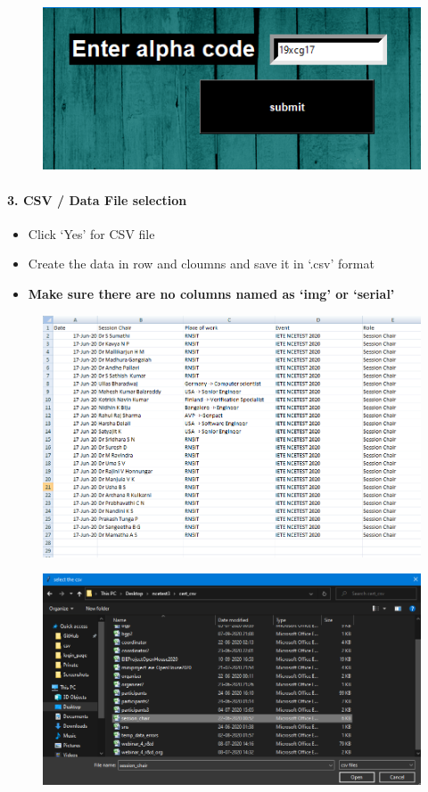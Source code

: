 \begin{figure}[H]
	\centering
	\includegraphics[width=0.5\linewidth]{"images/generation_qr_nqr/Screenshot (34)"}
	\label{fig:screenshot-34}
\end{figure}

\newpage
\paragraph{3. CSV / Data File selection}

\begin{itemize}
	\item Click `Yes' for CSV file
	\item Create the data in row and cloumns and save it in `.csv' format
	\item \textbf{Make sure there are no columns named as `img' or `serial'}
\end{itemize}

\begin{figure}[H]
	\centering
	\includegraphics[width=0.85\linewidth]{"images/generation_qr_nqr/Screenshot (37)"}
	\caption{}
	\label{fig:screenshot-37}
\end{figure}

\begin{figure}[H]
	\centering
	\includegraphics[width=0.9\linewidth]{"images/generation_qr_nqr/Screenshot (38)"}
	\caption{}
	\label{fig:screenshot-38}
\end{figure}

